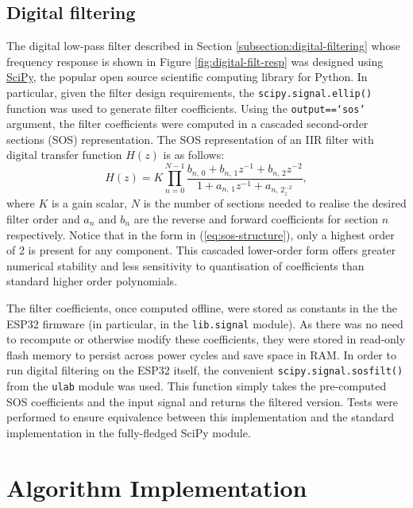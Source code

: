 \subsection{Digital filtering}
The digital low-pass filter described in Section \ref{subsection:digital-filtering} whose frequency response is shown in Figure \ref{fig:digital-filt-resp} was designed using \href{https://docs.scipy.org/doc/scipy/index.html}{SciPy}, the popular open source scientific computing library for Python. In particular, given the filter design requirements, the \texttt{scipy.signal.ellip()} function was used to generate filter coefficients. Using the \texttt{output==`sos'} argument, the filter coefficients were computed in a cascaded second-order sections (SOS) representation. The SOS representation of an IIR filter with digital transfer function $H(z)$ is as follows:
\begin{equation}
H(z)=K\prod_{n=0}^{N-1} \frac{b_{n,\, 0}+b_{n,\, 1} z^{-1}+b_{n,\, 2} z^{-2}}{1+a_{n,\, 1} z^{-1}+a_{n,\, 2}_{z}^{-2}},
\label{eq:sos-structure}
\end{equation}
where $K$ is a gain scalar, $N$ is the number of sections needed to realise the desired filter order and $a_n$ and $b_n$ are the reverse and forward coefficients for section $n$ respectively. Notice that in the form in (\ref{eq:sos-structure}), only a highest order of 2 is present for any component. This cascaded lower-order form offers greater numerical stability and less sensitivity to quantisation of coefficients than standard higher order polynomials.

The filter coefficients, once computed offline, were stored as constants in the the ESP32 firmware (in particular, in the \texttt{lib.signal} module). As there was no need to recompute or otherwise modify these coefficients, they were stored in read-only flash memory to persist across power cycles and save space in RAM. In order to run digital filtering on the ESP32 itself, the convenient \texttt{scipy.signal.sosfilt()} from the \texttt{ulab} module was used. This function simply takes the pre-computed SOS coefficients and the input signal and returns the filtered version. Tests were performed to ensure equivalence between this implementation and the standard implementation in the fully-fledged SciPy module.  

\section{Algorithm Implementation}
